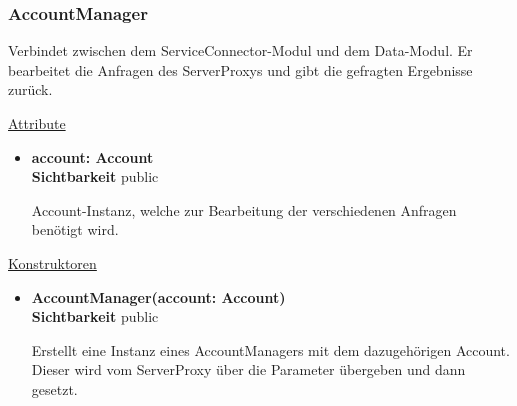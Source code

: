 \subsubsection{AccountManager}
Verbindet zwischen dem ServiceConnector-Modul und dem Data-Modul. Er bearbeitet die Anfragen des ServerProxys und gibt die gefragten Ergebnisse zurück. \newline

\underline{Attribute}
\begin{itemize}
\itemsep0pt
\item \textbf{account: Account} \hfill\\ 
\textbf{Sichtbarkeit} public

Account-Instanz, welche zur Bearbeitung der verschiedenen Anfragen benötigt wird.
\end{itemize}

\underline{Konstruktoren}
\begin{itemize}
\itemsep0pt
\item \textbf{AccountManager(account: Account)} \hfill\\
\textbf{Sichtbarkeit} public

Erstellt eine Instanz eines AccountManagers mit dem dazugehörigen Account. Dieser wird vom ServerProxy über die Parameter übergeben und dann gesetzt.
\end{itemize}

